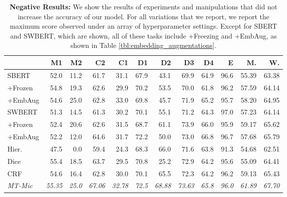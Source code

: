 \documentclass[11pt]{article}
\begin{document}
\begin{table*}[t]
    \centering
    \begin{tabular}{|l||r|r|r|r|r|r|r|r|r||r|r|}
    \hline
    {} &           M1 &     M2 &    C2 &     C1 &     D1 &     D2 &     D3 &     D4 &      E &  M. &  W. \\
    \hline
    SBERT &        52.0 &  11.2 &  61.7 &  31.1 &  67.9 &  43.1 &  69.9 &  64.9 &  96.6 &  55.39 &     63.38 \\
    +Frozen &      54.8 &  19.3 &  62.6 &  29.9 &  70.2 &  53.5 &  70.0 &  61.8 &  96.2 &  57.59 &     64.14 \\
    +EmbAug &      54.6 &  25.0 &  62.8 &  33.0 &  69.8 &  45.7 &  71.9 &  65.2 &  95.7 &  58.20 &     64.95 \\
    \hline
    SWBERT &       51.3 &  14.5 &  61.3 &  30.2 &  70.1 &  55.1 &  71.2 &  64.3 &  97.0 &  57.23 &     64.14 \\
    +Frozen &      52.4 &  20.6 &  62.6 &  31.5 &  68.7 &  61.1 &  73.9 &  66.0 &  95.9 &  59.17 &     65.62 \\
    +EmbAug &      52.2 &  12.0 &  64.6 &  31.7 &  72.2 &  50.0 &  73.0 &  66.8 &  96.7 &  57.68 &     65.79 \\
    \hline
    Hier. &        47.5 &  0.0 &   59.4 &  24.3 &  68.3 &  66.0 &  71.6 &  63.8 &  91.3 &  54.68 &     62.51 \\
    Dice &         55.4 &  18.5 &  63.7 &  29.5 &  70.8 &  25.2 &  72.9 &  64.2 &  95.6 &  55.09 &     64.41 \\
    CRF &          54.6 &  16.4 &  62.8 &  30.0 &  70.1 &  65.5 &  72.3 &  64.2 &  96.2 &  59.13 &     65.43 \\
    \hline
    \hline
    \textit{MT-Mic} &  \textit{55.35} &  \textit{25.0} & \textit{67.06} &  \textit{32.78} &  \textit{72.5} &  \textit{68.88} &  \textit{73.63} &  \textit{65.8} & \textit{96.0} & \textit{61.89} & \textit{67.70} \\
    \hline
    \end{tabular}
    \caption{\textbf{Negative Results:} We show the results of experiments and manipulations that did not increase the accuracy of our model. For all variations that we report, we report the maximum score observed under an array of hyperparameter settings. Except for SBERT and SWBERT, which are shown, all of these tasks include +Freezing and +EmbAug, as shown in Table \ref{tbl:embedding_augmentations}.}
    \label{tab:negative_results_uninformative}
\end{table*}
\end{document}

